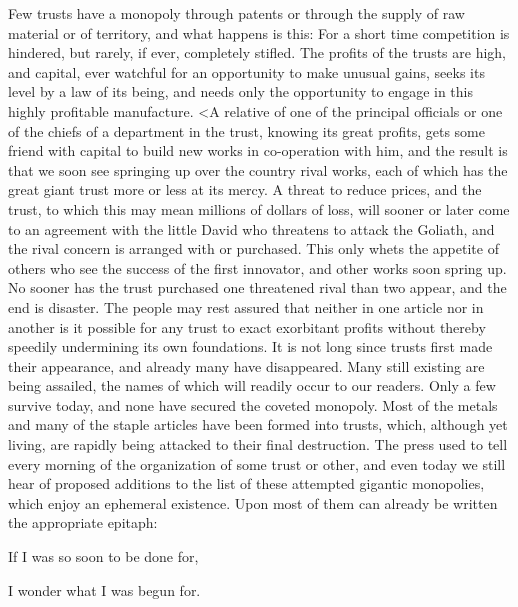 \documentclass[11pt,openany]{book}
\begin{document}
Few trusts have a monopoly through patents or through the supply of raw material or of territory, and what happens is this: For a short time competition is hindered, but rarely, if ever, completely stifled. The profits of the trusts are high, and capital, ever watchful for an opportunity to make unusual gains, seeks its level by a law of its being, and needs only the opportunity to engage in this highly profitable manufacture. <A relative of one of the principal officials or one of the chiefs of a department in the trust, knowing its great profits, gets some friend with capital to build new works in co-operation with him, and the result is that we soon see springing up over the country rival works, each of which has the great giant trust more or less at its mercy. A threat to reduce prices, and the trust, to which this may mean millions of dollars of loss, will sooner or later come to an agreement with the little David who threatens to attack the Goliath, and the rival concern is arranged with or purchased. This only whets the appetite of others who see the success of the first innovator, and other works soon spring up. No sooner has the trust purchased one threatened rival than two appear, and the end is disaster. The people may rest assured that neither in one article nor in another is it possible for any trust to exact exorbitant profits without thereby speedily undermining its own foundations. It is not long since trusts first made their appearance, and already many have disappeared. Many still existing are being assailed, the names of which will readily occur to our readers. Only a few survive today, and none have secured the coveted monopoly. Most of the metals and many of the staple articles have been formed into trusts, which, although yet living, are rapidly being attacked to their final destruction. The press used to tell every morning of the organization of some trust or other, and even today we still hear of proposed additions to the list of these attempted gigantic monopolies, which enjoy an ephemeral existence. Upon most of them can already be written the appropriate epitaph:

If I was so soon to be done for,

I wonder what I was begun for.
\end{document}
